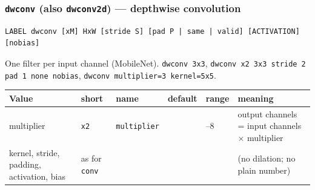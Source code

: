 \subsubsection*{\texttt{dwconv} (also \texttt{dwconv2d}) --- depthwise convolution}
\begin{Verbatim}[fontsize=\small]
LABEL dwconv [xM] HxW [stride S] [pad P | same | valid] [ACTIVATION] [nobias]
\end{Verbatim}
One filter per input channel (MobileNet). \texttt{dwconv 3x3}, \texttt{dwconv x2 3x3 stride 2 pad 1 none nobias},
\texttt{dwconv multiplier=3 kernel=5x5}.
\begin{longtable}{@{}>{\raggedright\arraybackslash}p{2.2cm}>{\raggedright\arraybackslash}p{3.3cm}>{\raggedright\arraybackslash}p{2.8cm}>{\raggedright\arraybackslash}p{1.5cm}>{\raggedright\arraybackslash}p{1.6cm}>{\raggedright\arraybackslash}p{3.1cm}@{}}
\toprule
\textbf{Value} & \textbf{short} & \textbf{name} & \textbf{default} & \textbf{range} & \textbf{meaning}\\
\midrule\endhead
multiplier & \texttt{x2} & \texttt{multiplier} & 1 & 1--8 & output channels = input channels $\times$ multiplier\\
kernel, stride, padding, activation, bias & as for \texttt{conv} & & & & (no dilation; no plain number)\\
\bottomrule
\end{longtable}

